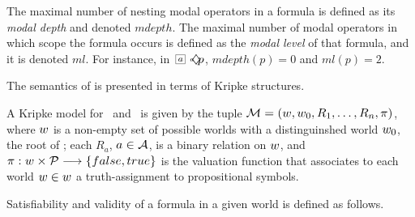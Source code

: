 

The maximal number of nesting modal operators in a formula is defined as its \emph{modal depth} and denoted $mdepth$. The maximal number of modal operators in which scope the formula occurs is defined as the \emph{modal level} of that formula, and it is denoted $ml$. For instance, in $\nec{a}\pos{a} p$, $mdepth(p) = 0$ and $ml(p) = 2$.

The semantics of  is presented in terms of Kripke structures.

\begin{definition}
    A Kripke model for \Prop~and \Agents~is given by the tuple $\Model = (\st, \st_0, R_1, \ldots, R_n, \pi)$,
    where $\st$ is a non-empty set of possible worlds with a distinguinshed world
    $\st_0$, the root of \Model; each $R_a$, $a \in \Agents$, is a binary relation
    on $\st$, and $\pi: \st \times \Prop \longrightarrow \{false, true\}$ is the
    valuation function that associates to each world $\st \in \st$ a
    truth-assignment to propositional symbols.
\end{definition}

Satisfiability and validity of a formula in a given world is defined as follows.


